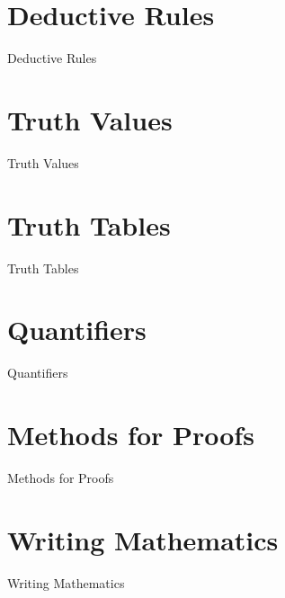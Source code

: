 \section{Deductive Rules}
\label{sec:deductive-rules}

Deductive Rules

\section{Truth Values}
\label{sec:truth-values}

Truth Values

\section{Truth Tables}
\label{sec:truth-tables}

Truth Tables

\section{Quantifiers}
\label{sec:quantifiers}

Quantifiers

\section{Methods for Proofs}
\label{sec:methods-for-proofs}

Methods for Proofs

\section{Writing Mathematics}
\label{sec:writing-mathematics}

Writing Mathematics

